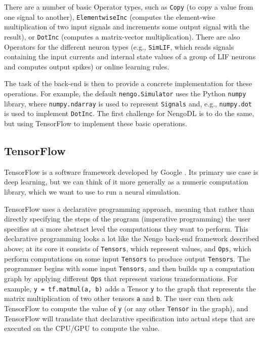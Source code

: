 \documentclass{article}
\begin{document}
There are a number of basic Operator types, such as \texttt{Copy} (to copy a value from one signal to another), \texttt{ElementwiseInc} (computes the element-wise multiplication of two input signals and increments some output signal with the result), or \texttt{DotInc} (computes a matrix-vector multiplication).  There are also Operators for the different neuron types (e.g., \texttt{SimLIF}, which reads signals containing the input currents and internal state values of a group of LIF neurons and computes output spikes) or online learning rules.

The task of the back-end is then to provide a concrete implementation for these operations.  For example, the default \texttt{nengo.Simulator} uses the Python \texttt{numpy} library, where \texttt{numpy.ndarray} is used to represent \texttt{Signals} and, e.g., \texttt{numpy.dot} is used to implement \texttt{DotInc}.  The first challenge for NengoDL is to do the same, but using TensorFlow to implement these basic operations.

\subsection{TensorFlow}

TensorFlow is a software framework developed by Google \citep{Abadi2016}.  Its primary use case is deep learning, but we can think of it more generally as a numeric computation library, which we want to use to run a neural simulation.

TensorFlow uses a declarative programming approach, meaning that rather than directly specifying the steps of the program (imperative programming) the user specifies at a more abstract level the computations they want to perform.  This declarative programming looks a lot like the Nengo back-end framework described above; at its core it consists of \texttt{Tensors}, which represent values, and \texttt{Ops}, which perform computations on some input \texttt{Tensors} to produce output \texttt{Tensors}. The programmer begins with some input \texttt{Tensors}, and then builds up a computation graph by applying different \texttt{Ops} that represent various transformations.  For example, \texttt{y = tf.matmul(a, b)} adds a Tensor \texttt{y} to the graph that represents the matrix multiplication of two other tensors \texttt{a} and \texttt{b}.  The user can then ask TensorFlow to compute the value of \texttt{y} (or any other \texttt{Tensor} in the graph), and TensorFlow will translate that declarative specification into actual steps that are executed on the CPU/GPU to compute the value.
\end{document}
